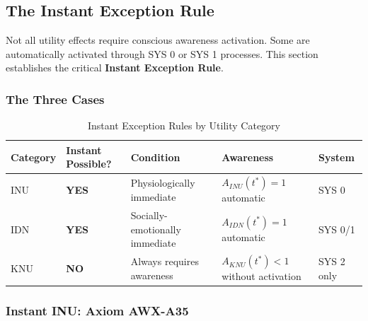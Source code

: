 \subsection{The Instant Exception Rule}
\label{subsec:11-5-instant-exception}


Not all utility effects require conscious awareness activation. Some are
automatically activated through SYS 0 or SYS 1 processes. This section
establishes the critical \textbf{Instant Exception Rule}.

\subsubsection{The Three Cases}

\begin{table}[htbp]
\centering
\caption{Instant Exception Rules by Utility Category}
\label{tab:instant-exceptions}
\renewcommand{\arraystretch}{1.4}
\begin{tabular}{@{}lllll@{}}
\toprule
\textbf{Category} & \textbf{Instant Possible?} & \textbf{Condition} & \textbf{Awareness} & \textbf{System} \\
\midrule
INU & \textbf{YES} & Physiologically immediate & $A_{INU}(t^*) = 1$ automatic & SYS 0 \\
IDN & \textbf{YES} & Socially-emotionally immediate & $A_{IDN}(t^*) = 1$ automatic & SYS 0/1 \\
KNU & \textbf{NO} & Always requires awareness & $A_{KNU}(t^*) < 1$ without activation & SYS 2 only \\
\bottomrule
\end{tabular}
\end{table}

\subsubsection{Instant INU: Axiom AWX-A35}

